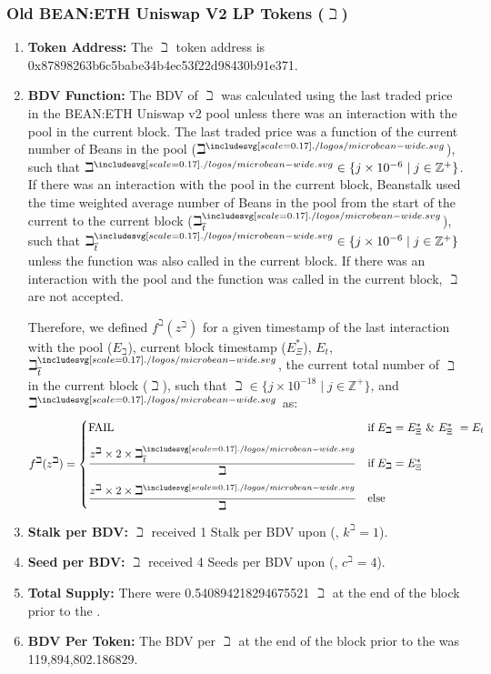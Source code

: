 \documentclass[class=article, crop=false]{standalone}
\begin{document}
\subsubsection{Old BEAN:ETH Uniswap V2 LP Tokens ($\beth$)}
\vspace*{-1.5mm}
    \begin{enumerate}
        \item \textbf{Token Address:} The $\beth$ token address is 0x87898263b6c5babe34b4ec53f22d98430b91e371.
        \item \textbf{BDV Function:} The BDV of $\beth$ was calculated using the last traded price in the BEAN:ETH Uniswap v2 pool unless there was an interaction with the pool in the current block. The last traded price was a function of the current number of Beans in the pool ($\beth^{\bean}$), such that $\beth^{\bean} \in \{j \times 10^{-6} \mid j \in \mathbb{Z}^{+} \}$. If there was an interaction with the pool in the current block, Beanstalk used the time weighted average number of Beans in the pool from the start of the current  to the current block ($\beth_{\overline{t}}^{\bean}$), such that $\beth_{\overline{t}}^{\bean} \in \{j \times 10^{-6} \mid j \in \mathbb{Z}^{+} \}$ unless the  function was also called in the current block. If there was an interaction with the pool and the  function was called in the current block, $\beth$  are not accepted. 
        
Therefore, we defined $f^{\beth}(z^{\beth})$ for a given timestamp of the last interaction with the pool ($E_{\beth}$), current block timestamp ($E_{\Xi}^*$), $E_t$, $\beth_{\overline{t}}^{\bean}$, the current total number of $\beth$ in the current block ($\beth$), such that $\beth \in \{j \times 10^{-18} \mid j \in \mathbb{Z}^{+} \}$, and $\beth^{\bean}$ as:
$$f^{\beth}(z^{\beth}) = \begin{cases} \text{FAIL} & \text{if} \; E_{\beth} = E_{\Xi}^*\ \&\ E_{\Xi}^*\ = E_t \vspace{.3cm} \\ 
\dfrac{z^{\beth} \times 2 \times \beth_{\overline{t}}^{\bean}}{\beth} & \text{if} \; E_{\beth} = E_{\Xi}^* \vspace{.3cm}\\ 
\dfrac{z^{\beth} \times 2 \times \beth^{\bean}}{\beth} & \text{else}\end{cases}$$

        \item \textbf{Stalk per BDV:} $\beth$  received 1 Stalk per BDV upon  (, $k^{\beth} = 1$).
        \item \textbf{Seed per BDV:} $\beth$  received 4 Seeds per BDV upon  (, $c^{\beth} = 4$).
        \item \textbf{Total Supply:} There were 0.540894218294675521 $\beth$ at the end of the block prior to the .
        \item \textbf{BDV Per Token:} The BDV per $\beth$ at the end of the block prior to the  was 119,894,802.186829.
    \end{enumerate}
\end{document}
